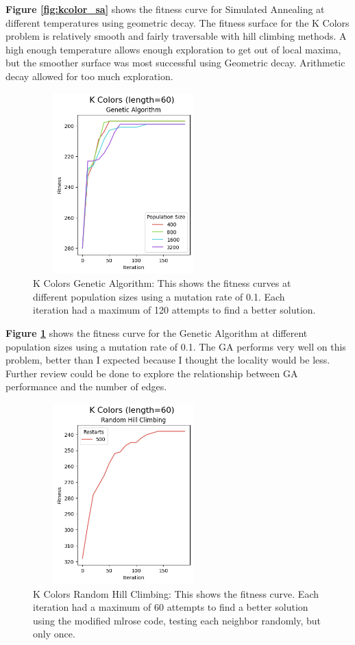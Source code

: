 \documentclass[letterpaper]{article} %
\begin{document}
\textbf{Figure \ref{fig:kcolor_sa}} shows the fitness curve for Simulated Annealing at different temperatures using geometric decay.  The fitness surface for the K Colors problem is relatively smooth and fairly traversable with hill climbing methods.  A high enough temperature allows enough exploration to get out of local maxima, but the smoother surface was most successful using Geometric decay.  Arithmetic decay allowed for too much exploration.


\begin{figure}[!htb]
\centering
\includegraphics[width=2.75in, height=2.75in]{figures/K_Colors_length=60_Genetic_Algorithm_l_60_ma_120_p_400__800__1600__3200_mu_0.1_.png}
\caption{K Colors Genetic Algorithm: This shows the fitness curves at different population sizes using a mutation rate of 0.1. Each iteration had a maximum of 120 attempts to find a better solution. }
\label{fig:kcolor_ga}
\end{figure}

\textbf{Figure \ref{fig:kcolor_ga}} shows the fitness curve for the Genetic Algorithm at different population sizes using a mutation rate of 0.1.   The GA performs very well on this problem, better than I expected because I thought the locality would be less.  Further review could be done to explore the relationship between GA performance and the number of edges.  

\begin{figure}[!htb]
\centering
\includegraphics[width=2.75in, height=2.75in]{figures/K_Colors_length=60_Random_Hill_Climbing_l_60_ma_60_r_500_.png}
\caption{K Colors Random Hill Climbing: This shows the fitness curve. Each iteration had a maximum of 60 attempts to find a better solution using the modified mlrose code, testing each neighbor randomly, but only once. }
\label{fig:kcolor_rhc}
\end{figure}
\end{document}
